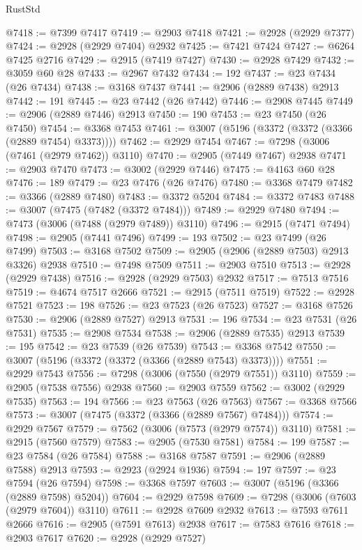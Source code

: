 \begin{lexlean}{RustStd}
\begin{coremodule}
@7418 := @7399 @7417
@7419 := @2903 @7418
@7421 := @2928 (@2929 @7377)
@7424 := @2928 (@2929 @7404) @2932
@7425 := @7421 @7424
@7427 := @6264 @7425 @2716
@7429 := @2915 (@7419 @7427)
@7430 := @2928 @7429
@7432 := @3059 @60 @28
@7433 := @2967 @7432
@7434 := 192
@7437 := @23 @7434 (@26 @7434)
@7438 := @3168 @7437
@7441 := @2906 (@2889 @7438) @2913
@7442 := 191
@7445 := @23 @7442 (@26 @7442)
@7446 := @2908 @7445
@7449 := @2906 (@2889 @7446) @2913
@7450 := 190
@7453 := @23 @7450 (@26 @7450)
@7454 := @3368 @7453
@7461 := @3007 (@5196 (@3372 (@3372 (@3366 (@2889 @7454) @3373))))
@7462 := @2929 @7454
@7467 := @7298 (@3006 (@7461 (@2979 @7462)) @3110)
@7470 := @2905 (@7449 @7467) @2938
@7471 := @2903 @7470
@7473 := @3002 (@2929 @7446)
@7475 := @4163 @60 @28
@7476 := 189
@7479 := @23 @7476 (@26 @7476)
@7480 := @3368 @7479
@7482 := @3366 (@2889 @7480)
@7483 := @3372 @5204
@7484 := @3372 @7483
@7488 := @3007 (@7475 (@7482 (@3372 @7484)))
@7489 := @2929 @7480
@7494 := @7473 (@3006 (@7488 (@2979 @7489)) @3110)
@7496 := @2915 (@7471 @7494)
@7498 := @2905 (@7441 @7496)
@7499 := 193
@7502 := @23 @7499 (@26 @7499)
@7503 := @3168 @7502
@7509 := @2905 (@2906 (@2889 @7503) @2913 @3326) @2938
@7510 := @7498 @7509
@7511 := @2903 @7510
@7513 := @2928 (@2929 @7438)
@7516 := @2928 (@2929 @7503) @2932
@7517 := @7513 @7516
@7519 := @4674 @7517 @2666
@7521 := @2915 (@7511 @7519)
@7522 := @2928 @7521
@7523 := 198
@7526 := @23 @7523 (@26 @7523)
@7527 := @3168 @7526
@7530 := @2906 (@2889 @7527) @2913
@7531 := 196
@7534 := @23 @7531 (@26 @7531)
@7535 := @2908 @7534
@7538 := @2906 (@2889 @7535) @2913
@7539 := 195
@7542 := @23 @7539 (@26 @7539)
@7543 := @3368 @7542
@7550 := @3007 (@5196 (@3372 (@3372 (@3366 (@2889 @7543) @3373))))
@7551 := @2929 @7543
@7556 := @7298 (@3006 (@7550 (@2979 @7551)) @3110)
@7559 := @2905 (@7538 @7556) @2938
@7560 := @2903 @7559
@7562 := @3002 (@2929 @7535)
@7563 := 194
@7566 := @23 @7563 (@26 @7563)
@7567 := @3368 @7566
@7573 := @3007 (@7475 (@3372 (@3366 (@2889 @7567) @7484)))
@7574 := @2929 @7567
@7579 := @7562 (@3006 (@7573 (@2979 @7574)) @3110)
@7581 := @2915 (@7560 @7579)
@7583 := @2905 (@7530 @7581)
@7584 := 199
@7587 := @23 @7584 (@26 @7584)
@7588 := @3168 @7587
@7591 := @2906 (@2889 @7588) @2913
@7593 := @2923 (@2924 @1936)
@7594 := 197
@7597 := @23 @7594 (@26 @7594)
@7598 := @3368 @7597
@7603 := @3007 (@5196 (@3366 (@2889 @7598) @5204))
@7604 := @2929 @7598
@7609 := @7298 (@3006 (@7603 (@2979 @7604)) @3110)
@7611 := @2928 @7609 @2932
@7613 := @7593 @7611 @2666
@7616 := @2905 (@7591 @7613) @2938
@7617 := @7583 @7616
@7618 := @2903 @7617
@7620 := @2928 (@2929 @7527)

\end{coremodule}
\end{lexlean}
